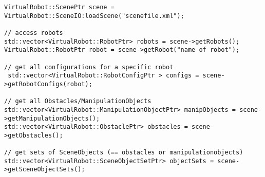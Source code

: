 \begin{lstlisting}
VirtualRobot::ScenePtr scene = VirtualRobot::SceneIO:loadScene("scenefile.xml");

// access robots
std::vector<VirtualRobot::RobotPtr> robots = scene->getRobots();
VirtualRobot::RobotPtr robot = scene->getRobot("name of robot");

// get all configurations for a specific robot
 std::vector<VirtualRobot::RobotConfigPtr > configs = scene->getRobotConfigs(robot);

// get all Obstacles/ManipulationObjects
std::vector<VirtualRobot::ManipulationObjectPtr> manipObjects = scene->getManipulationObjects();
std::vector<VirtualRobot::ObstaclePtr> obstacles = scene->getObstacles();

// get sets of SceneObjects (== obstacles or manipulationobjects)
std::vector<VirtualRobot::SceneObjectSetPtr> objectSets = scene->getSceneObjectSets();
\end{lstlisting}
